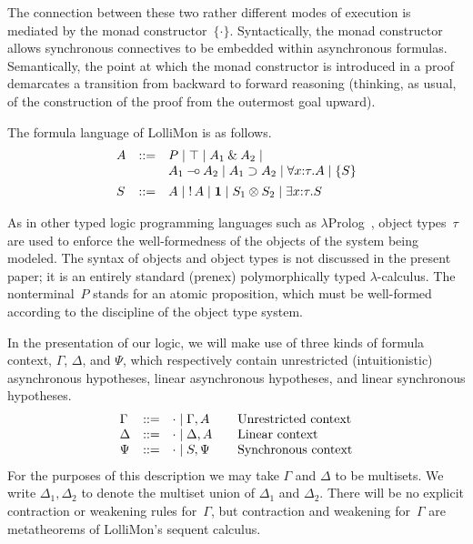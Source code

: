 \documentclass{sig-alt}
\begin{document}
The connection between these two rather different modes of execution is
mediated by the monad constructor~$\{\cdot\}$. Syntactically, the monad
constructor allows synchronous connectives to be embedded within
asynchronous formulas. Semantically, the point at which the monad
constructor is introduced in a proof demarcates a transition from
backward to forward reasoning (thinking, as usual, of the construction
of the proof from the outermost goal upward).

The formula language of LolliMon is as follows.
$$
\begin{array}{lll}
A & ::= &  P 
      \mid \top 
      \mid A_1 \mathbin{\&} A_2 
      \mid \\&& A_1 \mathbin{-\hspace{-0.70mm}\circ} A_2 
      \mid A_1 \supset A_2 
      \mid \forall x{:}\tau.A  
      \mid \{ S \} 
\\[1ex]
S & ::= &  A
      \mid \mathop{!} A
      \mid \textbf{1} 
      \mid S_1 \otimes S_2 
      \mid \exists x{:}\tau.S 
\end{array}
$$

As in other typed logic programming languages such as
$\lambda$Prolog~\cite{Miller86iclp}, object types~$\tau$ are used to
enforce the well-formedness of the objects of the system being
modeled.
The syntax of objects and object types is not discussed in the present
paper; it is an entirely standard (prenex) polymorphically typed
$\lambda$-calculus.  The nonterminal~$P$ stands for an atomic proposition,
which must be well-formed according to the discipline of the object type system.

In the presentation of our logic, we will make use of three kinds of
formula context, $\Gamma$, $\Delta$, and $\Psi$, which respectively contain unrestricted
(intuitionistic) asynchronous hypotheses, linear asynchronous
hypotheses, and linear synchronous hypotheses.
$$
\begin{array}{lll@{\qquad}l}
  \Gamma & ::= & \cdot \mid \Gamma, A & \mbox{Unrestricted context}\\
  \Delta & ::= & \cdot \mid \Delta, A & \mbox{Linear context}\\
  \Psi   & ::= & \cdot \mid S, \Psi & \mbox{Synchronous context}\\
\end{array}
$$
For the purposes of this description we may take $\Gamma$ and
$\Delta$ to be multisets. We write $\Delta_1,\Delta_2$ to
denote the multiset union of $\Delta_1$ and $\Delta_2$.
There will be no explicit contraction or weakening rules for~$\Gamma$,
but contraction and weakening for~$\Gamma$ are metatheorems of LolliMon's
sequent calculus.
\end{document}

